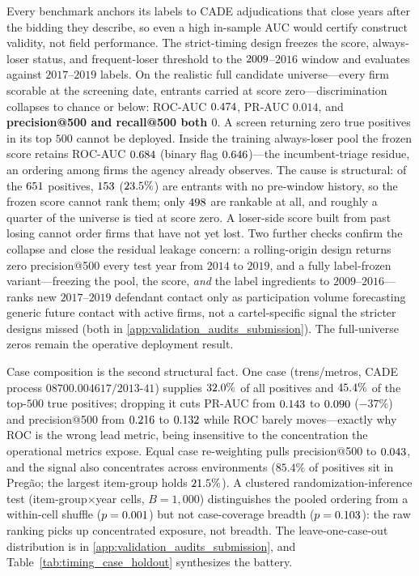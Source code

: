 Every benchmark anchors its labels to CADE adjudications that close
years after the bidding they describe, so even a high in-sample AUC
would certify construct validity, not field performance. The
strict-timing design freezes the score, always-loser status, and
frequent-loser threshold to the $2009$--$2016$ window and
evaluates against $2017$--$2019$ labels. On the realistic full
candidate universe---every firm scorable at the screening date,
entrants carried at score zero---discrimination collapses to chance
or below: ROC-AUC $0.474$, PR-AUC $0.014$, and
\textbf{precision@500 and recall@500 both $0$}. A screen returning
zero true positives in its top $500$ cannot be deployed. Inside the
training always-loser pool the frozen score retains ROC-AUC
$0.684$ (binary flag $0.646$)---the
incumbent-triage residue, an ordering among firms the agency
already observes. The cause is structural: of the
$651$ positives, $153$
($23.5\%$) are entrants with no pre-window history, so
the frozen score cannot rank them; only $498$
are rankable at all, and roughly a quarter of the universe is tied
at score zero. A loser-side score built from past losing cannot
order firms that have not yet lost. Two further checks confirm the
collapse and close the residual leakage concern: a rolling-origin
design returns zero precision@500 every test year from $2014$ to
$2019$, and a fully label-frozen variant---freezing the pool, the
score, \emph{and} the label ingredients to $2009$--$2016$---ranks new
$2017$--$2019$ defendant contact only as participation volume
forecasting generic future contact with active firms, not a
cartel-specific signal the stricter designs missed (both in
\ref{app:validation_audits_submission}). The full-universe zeros
remain the operative deployment result.

Case composition is the second structural fact. One case
(trens/metros, CADE process $08700.004617/2013\text{-}41$) supplies
$32.0\%$ of all positives and $45.4\%$ of the
top-$500$ true positives; dropping it cuts PR-AUC from
$0.143$ to $0.090$ ($-37\%$) and
precision@500 from $0.216$ to $0.132$ while
ROC barely moves---exactly why ROC is the wrong lead metric, being
insensitive to the concentration the operational metrics expose.
Equal case re-weighting pulls precision@500 to
$0.043$, and the signal also concentrates across
environments ($85.4\%$ of positives sit in Pregão; the largest
item-group holds $21.5\%$). A clustered
randomization-inference test (item-group$\times$year cells,
$B=1{,}000$) distinguishes the pooled ordering from a within-cell
shuffle ($p=0.001$) but not case-coverage breadth
($p=0.103$): the raw ranking picks up concentrated
exposure, not breadth. The leave-one-case-out distribution is in
\ref{app:validation_audits_submission}, and
Table~\ref{tab:timing_case_holdout} synthesizes the battery.

